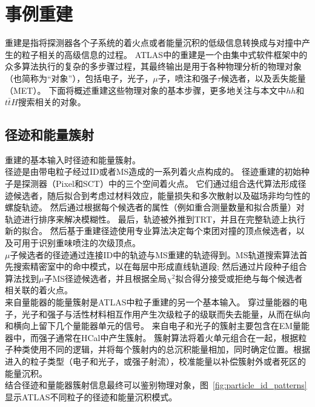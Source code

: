 \chapter{事例重建}
重建是指将探测器各个子系统的着火点或者能量沉积的低级信息转换成与对撞中产生的粒子相关的高级信息的过程。
ATLAS中的重建是一个由集中式软件框架中的众多算法执行的复杂的多步骤过程\cite{Calafiura:2005zz}，其最终输出是用于各种物理分析的物理对象（也简称为“对象”），包括电子，光子，$\mu$子，喷注和强子$\tau$候选者，以及丢失能量（MET）。 下面将概述重建这些物理对象的基本步骤，更多地关注与本文中$hh$和$t\bar{t}H$搜索相关的对象。

\section{径迹和能量簇射}
重建的基本输入时径迹和能量簇射。\\
径迹是由带电粒子经过ID或者MS造成的一系列着火点构成的。
径迹重建\cite{Cornelissen:1020106}的初始种子是探测器（Pixel和SCT）中的三个空间着火点。
它们通过组合迭代算法形成径迹候选者，随后拟合到考虑过材料效应，能量损失和多次散射以及磁场非均匀性的螺旋轨迹\cite{Cornelissen_2008}。
然后通过根据每个候选者的属性（例如重合测量数量和拟合质量）对轨迹进行排序来解决模糊性。 最后，轨迹被外推到TRT，并且在完整轨迹上执行新的拟合。
然后基于重建径迹使用专业算法\cite{Piacquadio_2008}决定每个束团对撞的顶点候选者，以及可用于识别重味喷注的次级顶点。\\
$\mu$子候选者的径迹通过连接ID中的轨迹与MS重建的轨迹得到。MS轨道搜索算法\cite{Benekos_2008}首先搜索精密室中的命中模式，以在每层中形成直线轨道段;
然后通过片段种子组合算法找到$\mu$子MS径迹候选者，并且根据全局$\chi^{2}$拟合得分接受或拒绝与每个候选者相关联的着火点。\\
来自量能器的能量簇射是ATLAS中粒子重建的另一个基本输入。 
穿过量能器的电子，光子和强子与活性材料相互作用产生次级粒子的级联而失去能量，从而在纵向和横向上留下几个量能器单元的信号。 来自电子和光子的簇射主要包含在EM量能器中，而强子通常在HCal中产生簇射。
簇射算法\cite{Lampl:1099735}将着火单元组合在一起，根据粒子种类使用不同的逻辑，并将每个簇射内的总沉积能量相加，同时确定位置。根据进入的粒子类型（电子和光子，或强子射流），校准能量以补偿簇射外或者死区的能量沉积。\\
结合径迹和量能器簇射信息最终可以鉴别物理对象，图~\ref{fig:particle_id_patterns}显示ATLAS不同粒子的径迹和能量沉积模式。
